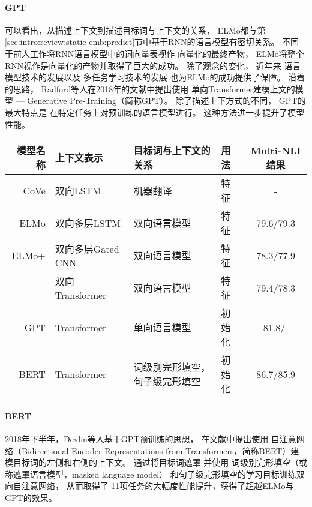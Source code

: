 \paragraph{GPT}
可以看出，从描述上下文到描述目标词与上下文的关系，
ELMo都与第\ref{sec:intro:review:static-emb:predict}节中基于RNN的语言模型有密切关系。
不同于前人工作将RNN语言模型中的词向量表视作
向量化的最终产物，
ELMo将整个RNN视作是向量化的产物并取得了巨大的成功。
除了观念的变化，
近年来
语言模型技术的发展\cite{Bengio:2003:NPL:944919.944966,DBLP:conf/interspeech/MikolovKBCK10,Kim:2016:CNL:3016100.3016285,jean-EtAl:2015:ACL-IJCNLP}以及
多任务学习技术的发展\cite{guo-EtAl:2016:COLING1,clark-EtAl:2018:EMNLP}
也为ELMo的成功提供了保障。
沿着\elmochinesetranslation 的思路，
Radford等人在2018年的文献中提出使用
单向Transformer建模上文的模型 --- Generative Pre-Training（简称GPT）。
除了描述上下方式的不同，
GPT的最大特点是
在特定任务上对预训练的语言模型进行\finetunechinesetranslation。
这种方法进一步提升了模型性能。

\begin{table}[t]
	\vspace{0.5em}\centering\wuhao
	\begin{tabular}{r lp{3.8cm}lc}
		\toprule[1.5pt]
		模型名称 &上下文表示 & 目标词与上下文的关系 & 用法 & Multi-NLI结果 \\
		\midrule[1pt]
		CoVe & 双向LSTM &  机器翻译& 特征 & - \\
		ELMo & 双向多层LSTM &  双向语言模型 & 特征 & 79.6/79.3 \\
		ELMo+ & 双向多层Gated CNN  & 双向语言模型 & 特征& 78.3/77.9 \\
		& 双向Transformer  & 双向语言模型 & 特征& 79.4/78.3 \\
		GPT & Transformer   & 单向语言模型 & 初始化& 81.8/- \\
		BERT & Transformer & 词级别完形填空，句子级完形填空 & 初始化 & 86.7/85.9
\\
		\bottomrule[1.5pt]
	\end{tabular}
\end{table}

\paragraph{BERT}
2018年下半年，Devlin等人基于GPT预训练的思想，
在文献中提出使用
自注意网络（Bidirectional Encoder Representations from Transformers，简称BERT）建模目标词的左侧和右侧的上下文。
通过将目标词遮罩
并使用
词级别完形填空（或称遮罩语言模型，masked language model）
和句子级完形填空的学习目标训练双向自注意网络，
从而取得了
11项任务的大幅度性能提升，获得了超越ELMo与GPT的效果。

